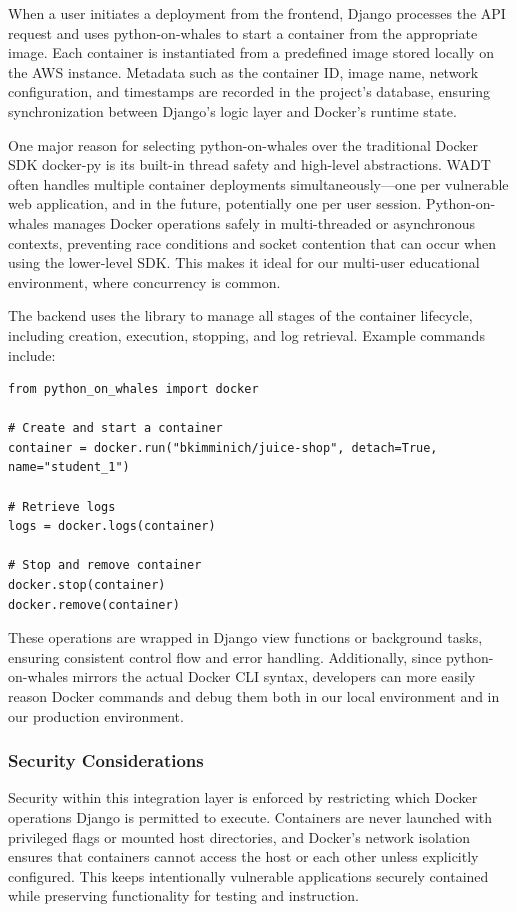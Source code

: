 \documentclass[12pt]{article}
\begin{document}
When a user initiates a deployment from the frontend, Django processes the API request and uses python-on-whales to start a container from the appropriate image. Each container is instantiated from a predefined image stored locally on the AWS instance. Metadata such as the container ID, image name, network configuration, and timestamps are recorded in the project’s database, ensuring synchronization between Django’s logic layer and Docker’s runtime state.

One major reason for selecting python-on-whales over the traditional Docker SDK docker-py is its built-in thread safety and high-level abstractions. WADT often handles multiple container deployments simultaneously—one per vulnerable web application, and in the future, potentially one per user session. Python-on-whales manages Docker operations safely in multi-threaded or asynchronous contexts, preventing race conditions and socket contention that can occur when using the lower-level SDK. This makes it ideal for our multi-user educational environment, where concurrency is common.

The backend uses the library to manage all stages of the container lifecycle, including creation, execution, stopping, and log retrieval. Example commands include:
\begin{verbatim}
from python_on_whales import docker

# Create and start a container
container = docker.run("bkimminich/juice-shop", detach=True, name="student_1")

# Retrieve logs
logs = docker.logs(container)

# Stop and remove container
docker.stop(container)
docker.remove(container)
\end{verbatim}

These operations are wrapped in Django view functions or background tasks, ensuring consistent control flow and error handling. Additionally, since python-on-whales mirrors the actual Docker CLI syntax, developers can more easily reason Docker commands and debug them both in our local environment and in our production environment.

\subsubsection{Security Considerations}
Security within this integration layer is enforced by restricting which Docker operations Django is permitted to execute. Containers are never launched with privileged flags or mounted host directories, and Docker’s network isolation ensures that containers cannot access the host or each other unless explicitly configured. This keeps intentionally vulnerable applications securely contained while preserving functionality for testing and instruction.
\end{document}
